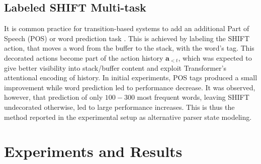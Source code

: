 \documentclass[11pt,a4paper]{article}
\begin{document}
\subsection{Labeled SHIFT Multi-task}

It is common practice for transition-based systems to add an additional Part of Speech (POS) or word prediction task \cite{bohnet2012transition}. This is achieved by labeling the \textrm{SHIFT} action, that moves a word from the buffer to the stack, with the word's tag. This decorated actions become part of the action history $\mathbf{a}_{<t}$, which was expected to give better visibility into stack/buffer content and exploit Transformer's attentional encoding of history. In initial experiments, POS tags produced a small improvement while word prediction led to performance decrease. It was observed, however, that prediction of only $100-300$ most frequent words, leaving \textrm{SHIFT} undecorated otherwise, led to large performance increases. This is thus the method reported in the experimental setup as alternative parser state modeling.


\section{Experiments and Results}
\label{section:expsetup}
\end{document}
